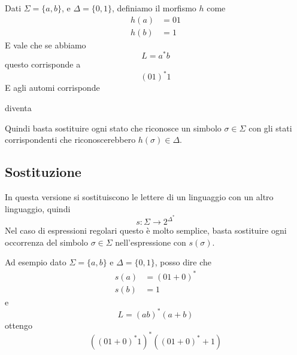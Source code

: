 \documentclass[12pt]{report}
\begin{document}
\begin{tcolorbox}
	Dati $\Sigma = \{a, b \}$, e $\Delta = \{0, 1\}$, definiamo il morfismo $h$ come
	\begin{align*}
		h(a) &= 01 \\
		h(b) &= 1 
	\end{align*}
	E vale che se abbiamo
	$$ L = a^*b$$
	questo corrisponde a
	$$ (01)^*1 $$
	E agli automi corrisponde
	\begin{center}
	\end{center}
	diventa
	\begin{center}
	\end{center}
	Quindi basta sostituire ogni stato che riconosce un simbolo $\sigma \in \Sigma$ con gli stati corrispondenti che riconoscerebbero $h(\sigma) \in \Delta$.
\end{tcolorbox}

\subsection{Sostituzione}
In questa versione si sostituiscono le lettere di un linguaggio con un altro linguaggio, quindi
$$ s : \Sigma \rightarrow 2^{\Delta^*} $$
Nel caso di espressioni regolari questo è molto semplice, basta sostituire ogni occorrenza del simbolo $\sigma \in \Sigma$ nell'espressione con $s(\sigma)$.
\begin{tcolorbox}
	Ad esempio dato $ \Sigma = \{a, b\}$ e $\Delta = \{0, 1\}$, posso dire che
	\begin{align*}
		s(a) &= (01 + 0)^* \\
		s(b) &= 1
	\end{align*}
	e
	$$ L = (ab)^*(a + b) $$
	ottengo
	$$ ((01 + 0)^*1)^*((01 + 0)^* + 1) $$
\end{tcolorbox}
\end{document}
